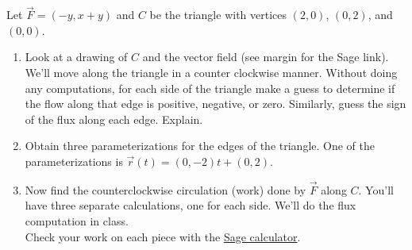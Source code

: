 \begin{problem}
%
%
Let $\vec F=(-y,x+y)$ and $C$ be the triangle with vertices $(2,0)$, $(0,2)$, and $(0,0)$.
\begin{enumerate}
\item Look at a drawing of $C$ and the vector field (see margin for the Sage link).  We'll move along the triangle in a counter clockwise manner. Without doing any computations, for each side of the triangle make a guess to determine if the flow along that edge is positive, negative, or zero. Similarly, guess the sign of the flux along each edge.  Explain. 
\item Obtain three parameterizations for the edges of the triangle.  One of the parameterizations is $\vec r(t) = (0,-2)t+(0,2)$. 
\item Now find the counterclockwise circulation (work) done by $\vec F$ along $C$.  You'll have three separate calculations, one for each side. We'll do the flux computation in class. \\ Check your work on each piece with the \href{\sageworkfluxurl}{Sage calculator}. 
\end{enumerate}
\end{problem}


